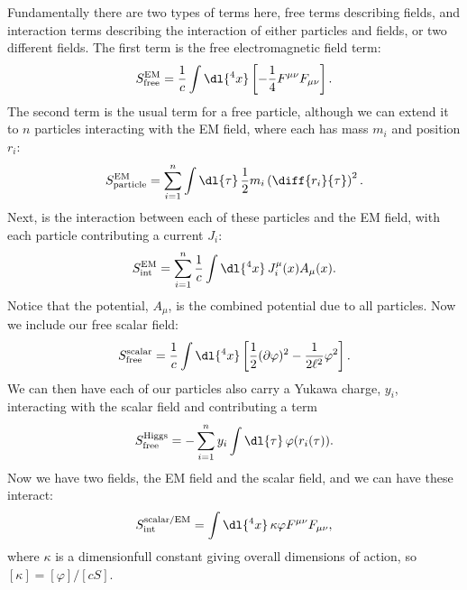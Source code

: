 Fundamentally there are two types of terms here, free terms describing fields, and interaction terms describing the interaction of either particles and fields, or two different fields.
The first term is the free electromagnetic field term:
\begin{equation}
    S_{\text{free}}^{\text{EM}} = \frac{1}{c} \int \dl{^4x} \left[ -\frac{1}{4}F^{\mu\nu}F_{\mu\nu} \right].
\end{equation}
The second term is the usual term for a free particle, although we can extend it to \(n\) particles interacting with the EM field, where each has mass \(m_i\) and position \(r_i\):
\begin{equation}
    S_{\text{particle}}^{\text{EM}} = \sum_{i=1}^{n} \int \dl{\tau} \, \frac{1}{2}m_i \left( \diff{r_i}{\tau} \right)^2.
\end{equation}
Next, is the interaction between each of these particles and the EM field, with each particle contributing a current \(J_i\):
\begin{equation}
    S_{\text{int}}^{\text{EM}} = \sum_{i=1}^{n} \frac{1}{c} \int \dl{^4x} \, J_i^\mu(x) A_\mu(x).
\end{equation}
Notice that the potential, \(A_\mu\), is the combined potential due to all particles.
Now we include our free scalar field:
\begin{equation}
    S_{\text{free}}^{\text{scalar}} = \frac{1}{c} \int \dl{^4x} \left[ \frac{1}{2}(\partial\varphi)^2 - \frac{1}{2\ell^2}\varphi^2 \right].
\end{equation}
We can then have each of our particles also carry a Yukawa charge, \(y_i\), interacting with the scalar field and contributing a term
\begin{equation}
    S_{\text{free}}^{\text{Higgs}} = -\sum_{i=1}^{n} y_i \int \dl{\tau} \, \varphi(r_i(\tau)).
\end{equation}
Now we have two fields, the EM field and the scalar field, and we can have these interact:
\begin{equation}
    S_{\text{int}}^{\text{scalar/EM}} = \int \dl{^4x} \, \kappa \varphi F^{\mu\nu}F_{\mu\nu},
\end{equation}
where \(\kappa\) is a dimensionfull constant giving overall dimensions of action, so \([\kappa] = [\varphi]/[cS]\).

